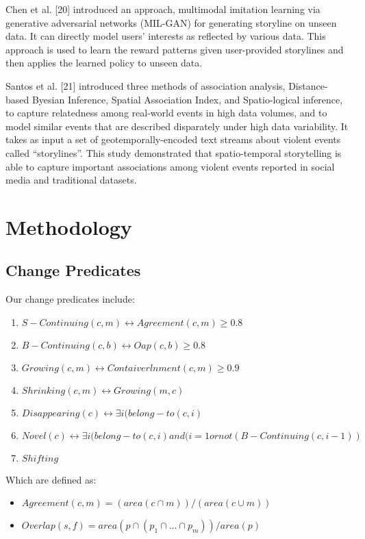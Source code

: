 \documentclass[conference]{IEEEtran}
\begin{document}
Chen et al. [20] introduced an approach, multimodal imitation learning via generative adversarial networks (MIL-GAN) for generating storyline on unseen data. It can directly model users’ interests as reflected by various data. This approach is used to learn the reward patterns given user-provided storylines and then applies the learned policy to unseen data.   




Santos et al. [21] introduced three methods of association analysis, Distance-based Byesian Inference, Spatial Association Index, and Spatio-logical inference, to capture relatedness among real-world events in high data volumes, and to model similar events that are described disparately under high data variability. It takes as input a set of geotemporally-encoded text streams about violent events called “storylines”. This study demonstrated that spatio-temporal storytelling is able to capture important associations among violent events reported in social media and traditional datasets. 


\section{Methodology}


\subsection{Change Predicates}


Our change predicates include:

\begin{enumerate}
	\item $S-Continuing (c,m)  \leftrightarrow  Agreement (c,m) \geq 0.8$
	\item $B-Continuing(c,b)  \leftrightarrow  Oap (c,b) \geq 0.8$
	\item $Growing(c,m)  \leftrightarrow  Contaiverlnment (c,m) \geq 0.9 $
	\item $Shrinking(c,m) \leftrightarrow Growing (m,c)$
	\item $Disappearing(c) \leftrightarrow \exists i (belong-to(c,i) $
	\item $Novel (c) \leftrightarrow  \exists i (belong-to(c,i) and (i=1 or not(B-Continuing(c,i-1)) $
	\item $Shifting$

\end{enumerate}

Which are defined as:

\begin{itemize}
	\item $Agreement (c, m) = (area(c\cap m))/(area(c\cup m))$

	\item $Overlap(s,f)= area(p\cap (p_1\cap …\cap p_m))/area(p)$

\end{itemize}
\end{document}
